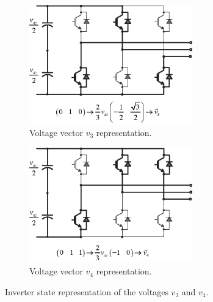 \documentclass[11pt,a4paper,oneside]{book}
\numberwithin{equation}{section}
\theoremstyle{it}
\theoremstyle{definition}
\begin{document}
\begin{figure}[H]
	\centering
	\begin{subfigure}{0.5\textwidth}
		\centering
		\includegraphics[width = 200pt, angle = 0, 
		keepaspectratio]{figures/vector_modulator/space_vector_4.eps}
		\captionsetup{width=0.45\textwidth, font=footnotesize}	
		\caption{Voltage vector $v_3$ representation.}
		\label{space_vector_4}
	\end{subfigure}%
	\begin{subfigure}{0.5\textwidth}
		\centering
		\includegraphics[width = 200pt, angle = 0, 
		keepaspectratio]{figures/vector_modulator/space_vector_5.eps}
		\captionsetup{width=0.45\textwidth, font=footnotesize}	
		\caption{Voltage vector $v_4$ representation.}
		\label{space_vector_5}
	\end{subfigure}
	\captionsetup{width=0.5\textwidth, font=small}	
	\caption{Inverter state representation of the voltages $v_3$ and $v_4$.}
	\label{space_vector_45}
\end{figure}
\end{document}
